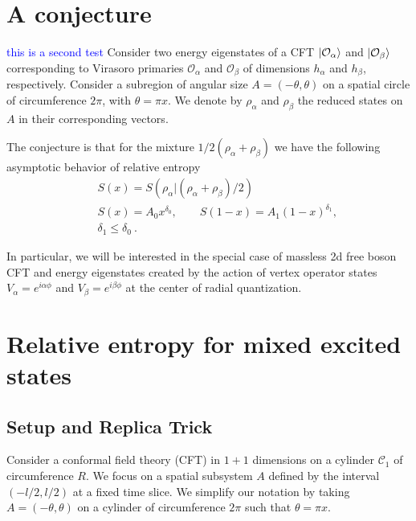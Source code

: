 \documentclass[11pt]{article}
\newcommand{\mO}{\mathcal{O}}
\newcommand{\nn}{\nonumber}
\newcommand{\NL}[1]{\textcolor{blue}{#1}}
\begin{document}
  \section{A conjecture}
\NL{this is a second test}
  Consider two energy eigenstates of a CFT $\ket{\mO_\alpha}$ and
  $\ket{\mO_\beta}$ corresponding to Virasoro primaries $\mO_{\alpha}$ and
  $\mO_{\beta}$ of dimensions $h_{\alpha}$ and $h_{\beta}$, respectively.
  Consider a subregion of angular size $A=(-\theta,\theta)$ on a spatial circle
  of circumference $2\pi$, with $\theta=\pi x$. We denote by $\rho_{\alpha}$ and
  $\rho_{\beta}$ the reduced states on $A$ in their corresponding vectors.

  The conjecture is that for the mixture $1/2(\rho_{\alpha}+\rho_{\beta})$ we
  have the following asymptotic behavior of relative entropy
  \begin{eqnarray}
    &&S(x)=S(\rho_\alpha|(\rho_\alpha+\rho_\beta)/2)\nn\\
    &&S(x)=A_0 x^{\delta_0}, \qquad S(1-x)=A_1(1-x)^{\delta_1},\nn\\
    &&\delta_1\leq \delta_0\ .
  \end{eqnarray}

  In particular, we will be interested in the special case of massless 2d free
  boson CFT and energy eigenstates created by the action of vertex operator
  states $V_{\alpha}=e^{i\alpha\phi}$ and $V_{\beta}= e^{i\beta\phi}$ at the
  center of radial quantization.

  \section{Relative entropy for mixed excited states}

  \subsection*{Setup and Replica Trick}

  Consider a conformal field theory (CFT) in $1+1$ dimensions on a cylinder
  $\mathcal{C}_{1}$ of circumference $R$. We focus on a spatial subsystem $A$ defined
  by the interval $(-l/2, l/2)$ at a fixed time slice. We simplify our notation
  by taking $A=(-\theta,\theta)$ on a cylinder of circumference $2\pi$ such that
  $\theta=\pi x$.
\end{document}
